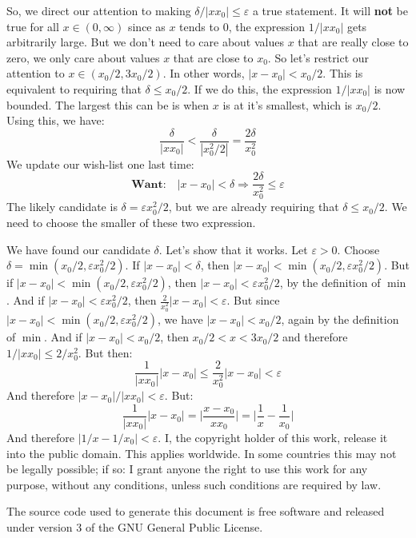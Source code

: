 \documentclass{article}
\theoremstyle{normal}
\begin{document}
    So, we direct our attention to making $\delta/|xx_{0}|\leq\varepsilon$ a
    true statement. It will \textbf{not} be true for all $x\in(0,\infty)$ since
    as $x$ tends to 0, the expression $1/|xx_{0}|$ gets arbitrarily large. But
    we don't need to care about values $x$ that are really close to zero, we
    only care about values $x$ that are close to $x_{0}$. So let's restrict
    our attention to $x\in(x_{0}/2,3x_{0}/2)$. In other words,
    $|x-x_{0}|<x_{0}/2$. This is equivalent to requiring that
    $\delta\leq{x}_{0}/2$. If we do this, the expression
    $1/|xx_{0}|$ is now bounded. The largest this can be is when $x$ is at
    it's smallest, which is $x_{0}/2$. Using this, we have:
    \begin{equation}
        \frac{\delta}{|xx_{0}|}<\frac{\delta}{|x_{0}^{2}/2|}
        =\frac{2\delta}{x_{0}^{2}}
    \end{equation}
    We update our wish-list one last time:
    \begin{equation}
        \textbf{Want:}\quad
        |x-x_{0}|<\delta
        \Rightarrow
        \frac{2\delta}{x_{0}^{2}}\leq\varepsilon
    \end{equation}
    The likely candidate is $\delta=\varepsilon{x}_{0}^{2}/2$, but we are
    already requiring that $\delta\leq{x}_{0}/2$. We need to choose the smaller
    of these two expression.
    \par\hfill\par
    We have found our candidate $\delta$. Let's show that it works.
    Let $\varepsilon>0$. Choose $\delta=\min(x_{0}/2,\varepsilon{x}_{0}^{2}/2)$.
    If $|x-x_{0}|<\delta$, then
    $|x-x_{0}|<\min(x_{0}/2,\varepsilon{x}_{0}^{2}/2)$. But if
    $|x-x_{0}|<\min(x_{0}/2,\varepsilon{x}_{0}^{2}/2)$, then
    $|x-x_{0}|<\varepsilon{x}_{0}^{2}/2$, by the definition of $\min$. And if
    $|x-x_{0}|<\varepsilon{x}_{0}^{2}/2$, then
    $\frac{2}{x_{0}^{2}}|x-x_{0}|<\varepsilon$. But since
    $|x-x_{0}|<\min(x_{0}/2,\varepsilon{x}_{0}^{2}/2)$, we have
    $|x-x_{0}|<x_{0}/2$, again by the definition of $\min$. And if
    $|x-x_{0}|<x_{0}/2$, then $x_{0}/2<x<3x_{0}/2$ and therefore
    $1/|xx_{0}|\leq2/x_{0}^{2}$. But then:
    \begin{equation}
        \frac{1}{|xx_{0}|}|x-x_{0}|
        \leq\frac{2}{x_{0}^{2}}|x-x_{0}|<\varepsilon
    \end{equation}
    And therefore $|x-x_{0}|/|xx_{0}|<\varepsilon$. But:
    \begin{equation}
        \frac{1}{|xx_{0}|}|x-x_{0}|
        =\big|\frac{x-x_{0}}{xx_{0}}\big|
        =\big|\frac{1}{x}-\frac{1}{x_{0}}\big|
    \end{equation}
    And therefore $|1/x-1/x_{0}|<\varepsilon$.
    \newpage
    I, the copyright holder of this work, release it into the public domain.
    This applies worldwide. In some countries this may not be legally possible;
    if so: I grant anyone the right to use this work for any purpose, without
    any conditions, unless such conditions are required by law.
    \par\hfill\par
    The source code used to generate this document is free software and released
    under version 3 of the GNU General Public License.
\end{document}
